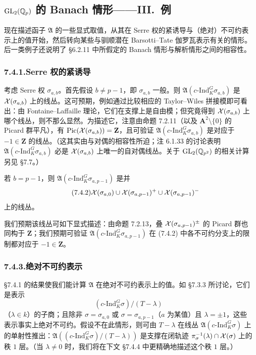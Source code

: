 \subsection{$\mathrm{GL}_2(\mathbb{Q}_p)$ 的 Banach 情形——III.\ 例}
现在描述函子 $\mathfrak A$ 的一些显式取值，从其在 Serre 权的紧诱导与（绝对）不可约表示上的值开始，然后转向某些与驯顺潜在 Barsotti--Tate 伽罗瓦表示有关的情形。后一类例子还说明了 §6.2.11 中所假定的 Banach 情形与解析情形之间的相容性。

\subsubsection*{7.4.1.\quad Serre 权的紧诱导}
考虑 Serre 权 $\sigma_{a,b}$。首先假设 $b\neq p-1$，即 $\sigma_{a,b}$ 一般。则 $\mathfrak A(c\text{-Ind}_K^G\sigma_{a,b})$ 是 $\mathcal{X}(\sigma_{a,b})$ 上的线丛。这可预期，例如通过比较相应的 Taylor--Wiles 拼接模即可看出：由 Fontaine--Laffaille 理论，它们在支撑上是自由模；但究竟得到 $\mathcal{X}(\sigma_{a,b})$ 上哪个线丛，则不那么显然。为描述它，注意由命题 7.2.11（以及 $\mathbf A^2\setminus\{0\}$ 的 Picard 群平凡），有 $\mathrm{Pic}(\mathcal{X}(\sigma_{a,b}))=\mathbf Z$，且可验证 $\mathfrak A(c\text{-Ind}_K^G\sigma_{a,b})$ 是对应于 $-1\in\mathbf Z$ 的线丛。（这其实由与对偶的相容性所迫；注 6.1.33 的讨论表明 $\mathfrak A(c\text{-Ind}_K^G\sigma_{a,b})$ 必是 $\mathcal{X}(\sigma_{a,b})$ 上唯一的自对偶线丛。关于 $\mathrm{GL}_2(\mathbb{Q}_{p^2})$ 的相关计算另见 §7.7。）

若 $b=p-1$，则 $\mathfrak A(c\text{-Ind}_K^G\sigma_{a,p-1})$ 是并
\begin{equation}\tag{7.4.2}\label{eq:a4-7-4-2}
\mathcal{X}(\sigma_{a,0})\cup\mathcal{X}(\sigma_{a,p-1})^+\cup\mathcal{X}(\sigma_{a,p-1})^-
\end{equation}
上的线丛。

我们预期该线丛可如下显式描述：由命题 7.2.13，叠 $\mathcal{X}(\sigma_{a,p-1})^\pm$ 的 Picard 群也同构于 $\mathbf Z$；我们预期可验证 $\mathfrak A(c\text{-Ind}_K^G\sigma_{a,p-1})$ 在 (7.4.2) 中各不可约分支上的限制都对应于 $-1\in\mathbf Z$。

\subsubsection*{7.4.3.\quad 绝对不可约表示}
§7.4.1 的结果使我们能计算 $\mathfrak A$ 在绝对不可约表示上的值。如 §7.3.3 所讨论，它们是表示
\[
(c\text{-Ind}_K^G\sigma)/(T-\lambda)
\]
（$\lambda\in k$）的子商；且除非 $\sigma=\sigma_{a,0}$ 或 $\sigma=\sigma_{a,p-1}$（$a$ 为某值）且 $\lambda=\pm1$，这些表示事实上绝对不可约。假设不在此情形，则可由 $T-\lambda$ 在线丛 $\mathfrak A(c\text{-Ind}_K^G\sigma)$ 上的单射性推出：$\mathfrak A((c\text{-Ind}_K^G\sigma)/(T-\lambda))$ 是支撑在闭轨迹 $\pi_\sigma^{-1}(\lambda)\cap\mathcal{X}(\sigma)$ 上的秩 $1$ 层。（当 $\lambda\neq0$ 时，我们将在下文 §7.4.4 中更精确地描述这个秩 $1$ 层。）

